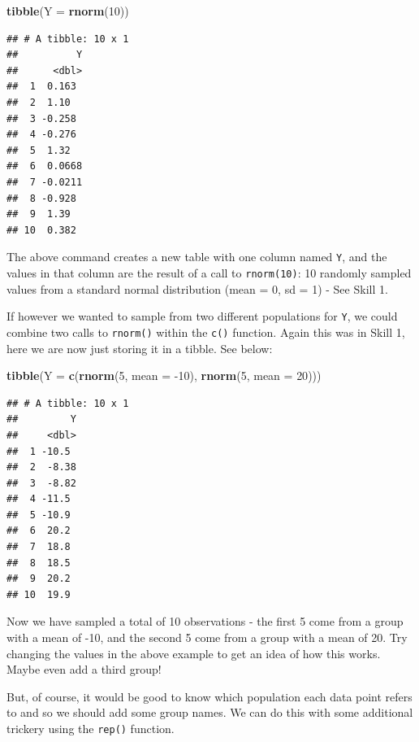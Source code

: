 \documentclass[]{book}
\newenvironment{Shaded}{\begin{snugshade}}{\end{snugshade}}
\newcommand{\DataTypeTok}[1]{\textcolor[rgb]{0.13,0.29,0.53}{#1}}
\newcommand{\DecValTok}[1]{\textcolor[rgb]{0.00,0.00,0.81}{#1}}
\newcommand{\KeywordTok}[1]{\textcolor[rgb]{0.13,0.29,0.53}{\textbf{#1}}}
\newcommand{\NormalTok}[1]{#1}
\begin{document}
\begin{Shaded}
\begin{Highlighting}[]
\KeywordTok{tibble}\NormalTok{(}\DataTypeTok{Y =} \KeywordTok{rnorm}\NormalTok{(}\DecValTok{10}\NormalTok{))}
\end{Highlighting}
\end{Shaded}

\begin{verbatim}
## # A tibble: 10 x 1
##          Y
##      <dbl>
##  1  0.163 
##  2  1.10  
##  3 -0.258 
##  4 -0.276 
##  5  1.32  
##  6  0.0668
##  7 -0.0211
##  8 -0.928 
##  9  1.39  
## 10  0.382
\end{verbatim}

The above command creates a new table with one column named \texttt{Y}, and the values in that column are the result of a call to \texttt{rnorm(10)}: 10 randomly sampled values from a standard normal distribution (mean = 0, sd = 1) - See Skill 1.

If however we wanted to sample from two different populations for \texttt{Y}, we could combine two calls to \texttt{rnorm()} within the \texttt{c()} function. Again this was in Skill 1, here we are now just storing it in a tibble. See below:

\begin{Shaded}
\begin{Highlighting}[]
\KeywordTok{tibble}\NormalTok{(}\DataTypeTok{Y =} \KeywordTok{c}\NormalTok{(}\KeywordTok{rnorm}\NormalTok{(}\DecValTok{5}\NormalTok{, }\DataTypeTok{mean =} \DecValTok{-10}\NormalTok{), }
             \KeywordTok{rnorm}\NormalTok{(}\DecValTok{5}\NormalTok{, }\DataTypeTok{mean =}  \DecValTok{20}\NormalTok{)))}
\end{Highlighting}
\end{Shaded}

\begin{verbatim}
## # A tibble: 10 x 1
##         Y
##     <dbl>
##  1 -10.5 
##  2  -8.38
##  3  -8.82
##  4 -11.5 
##  5 -10.9 
##  6  20.2 
##  7  18.8 
##  8  18.5 
##  9  20.2 
## 10  19.9
\end{verbatim}

Now we have sampled a total of 10 observations - the first 5 come from a group with a mean of -10, and the second 5 come from a group with a mean of 20. Try changing the values in the above example to get an idea of how this works. Maybe even add a third group!

But, of course, it would be good to know which population each data point refers to and so we should add some group names. We can do this with some additional trickery using the \texttt{rep()} function.
\end{document}
